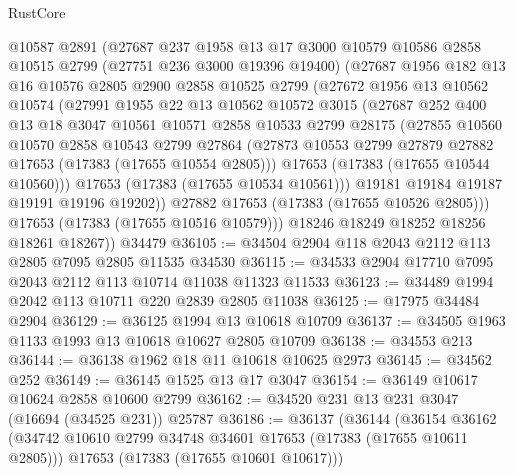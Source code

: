 \begin{lexlean}{RustCore}
\begin{coremodule}
        @10587
        @2891
        (@27687
          @237
          @1958
          @13
          @17
          @3000
          @10579
          @10586
          @2858
          @10515
          @2799
          (@27751 @236 @3000 @19396 @19400)
          (@27687
            @1956
            @182
            @13
            @16
            @10576
            @2805
            @2900
            @2858
            @10525
            @2799
            (@27672
              @1956
              @13
              @10562
              @10574
              (@27991
                @1955
                @22
                @13
                @10562
                @10572
                @3015
                (@27687
                  @252
                  @400
                  @13
                  @18
                  @3047
                  @10561
                  @10571
                  @2858
                  @10533
                  @2799
                  @28175
                  (@27855
                    @10560
                    @10570
                    @2858
                    @10543
                    @2799
                    @27864
                    (@27873 @10553 @2799 @27879 @27882 @17653 (@17383 (@17655 @10554 @2805)))
                    @17653
                    (@17383 (@17655 @10544 @10560)))
                  @17653
                  (@17383 (@17655 @10534 @10561)))
                @19181
                @19184
                @19187
                @19191
                @19196
                @19202))
            @27882
            @17653
            (@17383 (@17655 @10526 @2805)))
          @17653
          (@17383 (@17655 @10516 @10579)))
        @18246
        @18249
        @18252
        @18256
        @18261
        @18267))
    @34479
@36105 := @34504 @2904 @118 @2043 @2112 @113 @2805 @7095 @2805 @11535 @34530
@36115 := @34533 @2904 @17710 @7095 @2043 @2112 @113 @10714 @11038 @11323 @11533
@36123 := @34489 @1994 @2042 @113 @10711 @220 @2839 @2805 @11038
@36125 := @17975 @34484 @2904
@36129 := @36125 @1994 @13 @10618 @10709
@36137 := @34505 @1963 @1133 @1993 @13 @10618 @10627 @2805 @10709
@36138 := @34553 @213
@36144 := @36138 @1962 @18 @11 @10618 @10625 @2973
@36145 := @34562 @252
@36149 := @36145 @1525 @13 @17 @3047
@36154 := @36149 @10617 @10624 @2858 @10600 @2799
@36162 := @34520 @231 @13 @231 @3047 (@16694 (@34525 @231)) @25787
@36186 := @36137
    (@36144
      (@36154
        @36162
        (@34742 @10610 @2799 @34748 @34601 @17653 (@17383 (@17655 @10611 @2805)))
        @17653
        (@17383 (@17655 @10601 @10617)))

\end{coremodule}
\end{lexlean}
